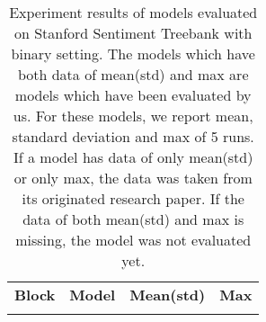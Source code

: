 \begin{table}[H]
    \centering
    \caption[Experiment result on SST]{Experiment results of models evaluated on Stanford Sentiment Treebank with binary setting.
The models which have both data of mean(std) and max are models which have been evaluated by us.
For these models, we report mean, standard deviation and max of 5 runs.
If a model has data of only mean(std) or only max, the data was taken from its originated research paper.
If the data of both mean(std) and max is missing, the model was not evaluated yet.}
    \label{table:experimentresult}
    \begin{tabular}{c|lll}
    \textbf{Block}    & \textbf{Model}  & \textbf{Mean(std)} & \textbf{Max}   \\
\Xhline{3\arrayrulewidth}
\Xhline{3\arrayrulewidth}


\end{tabular}
\end{table}
